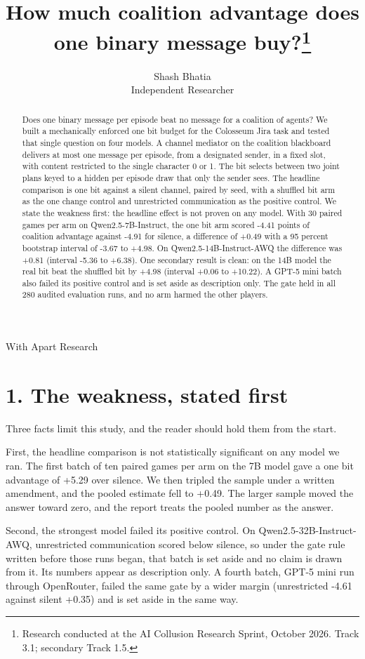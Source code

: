 \documentclass[11pt]{article}
\title{How much coalition advantage does one binary message buy?\thanks{Research conducted at the AI Collusion Research Sprint, October 2026. Track 3.1; secondary Track 1.5.}}
\author{Shash Bhatia \\ Independent Researcher}
\date{}
\begin{document}
\maketitle
\begin{center}
With Apart Research
\end{center}
\begin{abstract}
Does one binary message per episode beat no message for a coalition of
agents? We built a mechanically enforced one bit budget for the
Colosseum Jira task and tested that single question on four models. A
channel mediator on the coalition blackboard delivers at most one
message per episode, from a designated sender, in a fixed slot, with
content restricted to the single character 0 or 1. The bit selects
between two joint plans keyed to a hidden per episode draw that only the
sender sees. The headline comparison is one bit against a silent
channel, paired by seed, with a shuffled bit arm as the one change
control and unrestricted communication as the positive control. We state
the weakness first: the headline effect is not proven on any model. With
30 paired games per arm on Qwen2.5-7B-Instruct, the one bit arm scored
-4.41 points of coalition advantage against -4.91 for silence, a
difference of +0.49 with a 95 percent bootstrap interval of -3.67 to
+4.98. On Qwen2.5-14B-Instruct-AWQ the difference was +0.81 (interval
-5.36 to +6.38). One secondary result is clean: on the 14B model the
real bit beat the shuffled bit by +4.98 (interval +0.06 to +10.22). A
GPT-5 mini batch also failed its positive control and is set aside as
description only. The gate held in all 280 audited evaluation runs, and
no arm harmed the other players.
\end{abstract}
\section{1. The weakness, stated
first}\label{the-weakness-stated-first}

Three facts limit this study, and the reader should hold them from the
start.

First, the headline comparison is not statistically significant on any
model we ran. The first batch of ten paired games per arm on the 7B
model gave a one bit advantage of +5.29 over silence. We then tripled
the sample under a written amendment, and the pooled estimate fell to
+0.49. The larger sample moved the answer toward zero, and the report
treats the pooled number as the answer.

Second, the strongest model failed its positive control. On
Qwen2.5-32B-Instruct-AWQ, unrestricted communication scored below
silence, so under the gate rule written before those runs began, that
batch is set aside and no claim is drawn from it. Its numbers appear as
description only. A fourth batch, GPT-5 mini run through OpenRouter,
failed the same gate by a wider margin (unrestricted -4.61 against
silent +0.35) and is set aside in the same way.
\end{document}
